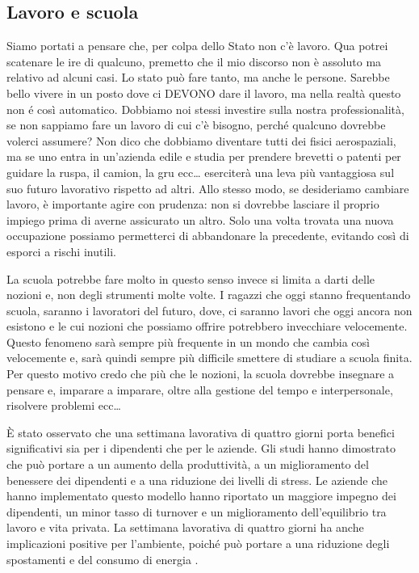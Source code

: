 \documentclass[12pt]{book} %
\begin{document}
\subsection{Lavoro e scuola}
Siamo portati a pensare che, per colpa dello Stato non
c'è lavoro. Qua potrei scatenare le ire di qualcuno, premetto che il mio discorso non è assoluto
ma relativo ad alcuni casi. Lo stato può fare tanto, ma anche le persone. Sarebbe bello vivere in un posto
dove ci DEVONO dare il lavoro, ma nella realtà questo non é così automatico. Dobbiamo noi stessi investire sulla nostra
professionalità, se non sappiamo fare un lavoro di cui c'è bisogno, perché qualcuno dovrebbe volerci assumere? 
Non dico che dobbiamo
diventare tutti dei fisici aerospaziali, ma se uno entra in un'azienda edile e studia per prendere
brevetti o patenti per guidare la ruspa, il camion, la gru ecc… eserciterà una leva più vantaggiosa sul suo
futuro lavorativo rispetto ad altri. 
Allo stesso modo, se desideriamo cambiare lavoro, è importante agire con prudenza: non si dovrebbe lasciare il proprio impiego prima di averne assicurato un altro. Solo una volta trovata una nuova occupazione possiamo permetterci di abbandonare la precedente, evitando così di esporci a rischi inutili.

La scuola potrebbe fare molto in questo senso invece si
limita a darti delle nozioni e, non degli strumenti molte volte. I ragazzi che oggi stanno frequentando scuola, saranno
i lavoratori del futuro, dove, ci saranno lavori che oggi ancora non esistono e le cui nozioni che possiamo offrire potrebbero invecchiare velocemente. Questo fenomeno sarà sempre più frequente in un mondo che cambia così velocemente e, sarà quindi sempre più difficile smettere di studiare a scuola finita. Per questo motivo credo che più che le nozioni, la scuola dovrebbe insegnare a pensare e, imparare a imparare, oltre alla gestione del tempo e interpersonale, risolvere problemi ecc… 

\begin{mdframed}[linewidth=1pt]
È stato osservato che una settimana lavorativa di quattro giorni porta benefici significativi sia per i dipendenti che per le aziende. Gli studi hanno dimostrato che può portare a un aumento della produttività, a un miglioramento del benessere dei dipendenti e a una riduzione dei livelli di stress. Le aziende che hanno implementato questo modello hanno riportato un maggiore impegno dei dipendenti, un minor tasso di turnover e un miglioramento dell'equilibrio tra lavoro e vita privata. La settimana lavorativa di quattro giorni ha anche implicazioni positive per l'ambiente, poiché può portare a una riduzione degli spostamenti e del consumo di energia .
\end{mdframed}
\end{document}
